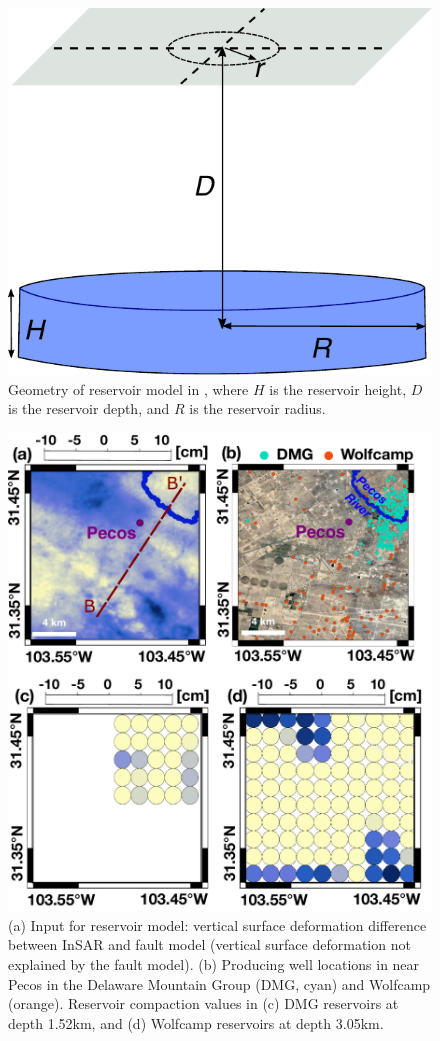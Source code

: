 \documentclass{utexasthesis}
\begin{document}
\begin{figure}
	\centering
	\includegraphics[width=.8\textwidth]{paper1-permian/figures/supplement/figureS10-reservoir-geom.pdf}
	\caption{
		Geometry of reservoir model in \cite{Geertsma1973}, where $H$ is the reservoir height, $D$ is the reservoir depth, and $R$ is the reservoir radius.
	}
	\label{fig:model-reservoir-geom}
\end{figure}

\begin{figure}
	\centering
	\includegraphics[width=\textwidth]{paper1-permian/figures/supplement/figureS11-reservoir-wells.pdf}
	\caption{(a) Input for reservoir model: vertical surface deformation difference between InSAR and fault model (vertical surface deformation not explained by the fault model). (b) Producing well locations in near Pecos in the Delaware Mountain Group (DMG, cyan) and Wolfcamp (orange). Reservoir compaction values in (c) DMG reservoirs at depth 1.52km, and (d) Wolfcamp reservoirs at depth 3.05km. 
	}
	\label{fig:model-reservoir-wells}
\end{figure}
\end{document}
